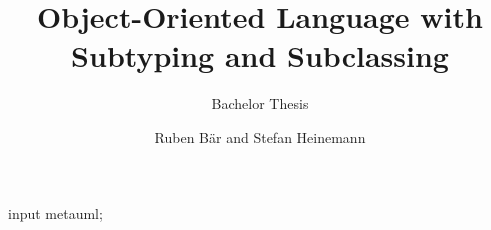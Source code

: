 \begin{empfile}
\begin{empcmds}
input metauml;
\end{empcmds}


\title{Object-Oriented Language with Subtyping and Subclassing}
\subtitle{Bachelor Thesis}

\author{Ruben Bär and Stefan Heinemann}



\maketitle

\listoftodos





\thispagestyle{empty}

\setcounter{tocdepth}{1}
\tableofcontents

\clrpage
{}

\renewcommand*{\partpagestyle}{empty}













\clrpage




\end{empfile}

